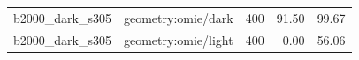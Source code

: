\begin{longtable}{l>{\raggedright\arraybackslash}p{.42\linewidth}rrr}
b2000\_\allowbreak{}dark\_\allowbreak{}s305 & %
geometry:omie/dark & %
400 & %
91.50 & %
99.67 \\ %

b2000\_\allowbreak{}dark\_\allowbreak{}s305 & %
geometry:omie/light & %
400 & %
0.00 & %
56.06 \\ %


\end{longtable}
